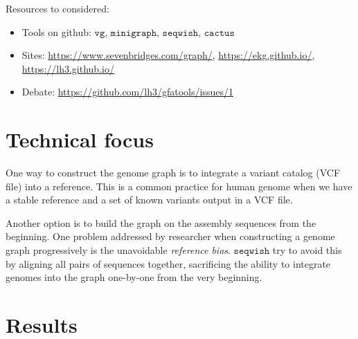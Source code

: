\documentclass[10pt,twocolumn,twoside]{genpaper}
\newcommand{\vg}{$\mathtt{vg}$}
\newcommand{\mg}{$\mathtt{minigraph}$}
\newcommand{\sw}{$\mathtt{seqwish}$}
\begin{document}
Resources to considered:
\begin{itemize}
\item Tools on github: \vg{}, \mg{}, \sw{}, $\mathtt{cactus}$
\item Sites: \url{https://www.sevenbridges.com/graph/}, \url{https://ekg.github.io/}, \url{https://lh3.github.io/}
\item Debate: \url{https://github.com/lh3/gfatools/issues/1}
\end{itemize}
\section*{Technical focus}
One way to construct the genome graph is to integrate a variant catalog (VCF file) into a reference. This is a common practice for human genome when we have a stable reference and a set of known variants output in a VCF file.

Another option is to build the graph on the assembly sequences from the beginning.
One problem addressed by researcher when constructing a genome graph progressively is the unavoidable \emph{reference bias}.
\sw{} try to avoid this by aligning all pairs of sequences together, sacrificing the ability to integrate genomes into the graph one-by-one from the very beginning.
\section*{Results}


 
\end{document}
